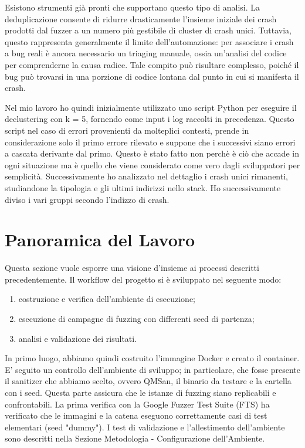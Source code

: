 Esistono strumenti già pronti che supportano questo tipo di analisi. La deduplicazione consente di ridurre drasticamente l’insieme iniziale dei crash prodotti dal fuzzer a un numero più gestibile di cluster di crash unici. Tuttavia, questo rappresenta generalmente il limite dell’automazione: per associare i crash a bug reali è ancora necessario un triaging manuale, ossia un’analisi del codice per comprenderne la causa radice. Tale compito può risultare complesso, poiché il bug può trovarsi in una porzione di codice lontana dal punto in cui si manifesta il crash.

Nel mio lavoro ho quindi inizialmente utilizzato uno script Python per eseguire il declustering con k = 5, fornendo come input i log raccolti in precedenza. Questo script nel caso di errori provenienti da molteplici contesti, prende in considerazione solo il primo errore rilevato e suppone che i successivi siano errori a cascata derivante dal primo. Questo è stato fatto non perchè è ciò che accade in ogni situazione ma è quello che viene considerato come vero dagli sviluppatori per semplicità.  Successivamente ho analizzato nel dettaglio i crash unici rimanenti, studiandone la tipologia e gli ultimi indirizzi nello stack. Ho successivamente diviso i vari gruppi secondo l’indizzo di crash. 

\section{Panoramica del Lavoro}

Questa sezione vuole esporre una visione d'insieme ai processi descritti precedentemente. 
Il workflow del progetto si è sviluppato nel seguente modo:

\begin{enumerate}
  \item costruzione e verifica dell'ambiente di esecuzione;
  \item esecuzione di campagne di fuzzing con differenti seed di partenza;
  \item analisi e validazione dei risultati. 
\end{enumerate}

In primo luogo, abbiamo quindi costruito l'immagine Docker e creato il container. E' seguito un controllo dell'ambiente di sviluppo; in particolare, che fosse presente il sanitizer che abbiamo scelto, ovvero QMSan, il binario da testare e la cartella con i seed. 
Questa parte assicura che le istanze di fuzzing siano replicabili e confrontabili.  La prima verifica con la Google Fuzzer Test Suite (FTS) ha verificato che le immagini e la catena eseguono correttamente casi di test elementari (seed "dummy").  I test di validazione e l'allestimento dell'ambiente sono descritti nella Sezione Metodologia - Configurazione dell'Ambiente.


